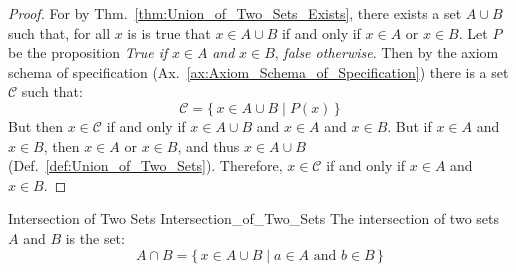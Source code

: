         \begin{proof}
            For by Thm.~\ref{thm:Union_of_Two_Sets_Exists}, there exists
            a set $A\cup{B}$ such that, for all $x$ is is true that
            $x\in{A}\cup{B}$ if and only if $x\in{A}$ or $x\in{B}$. Let
            $P$ be the proposition \textit{True if} $x\in{A}$ \textit{and}
            $x\in{B}$, \textit{false otherwise}. Then by the axiom schema
            of specification (Ax.~\ref{ax:Axiom_Schema_of_Specification})
            there is a set $\mathcal{C}$ such that:
            \begin{equation}
                \mathcal{C}=\big\{\,x\in{A}\cup{B}\;|\;P(x)\,\big\}
            \end{equation}
            But then $x\in\mathcal{C}$ if and only if $x\in{A}\cup{B}$ and
            $x\in{A}$ and $x\in{B}$. But if $x\in{A}$ and $x\in{B}$, then
            $x\in{A}$ or $x\in{B}$, and thus $x\in{A}\cup{B}$
            (Def.~\ref{def:Union_of_Two_Sets}). Therefore, $x\in\mathcal{C}$
            if and only if $x\in{A}$ and $x\in{B}$.
        \end{proof}
        \begin{fdefinition}{Intersection of Two Sets}
                           {Intersection_of_Two_Sets}
            The \gls{intersection of two sets} $A$ and $B$ is the set:
            \begin{equation*}
                A\cap{B}
                =\big\{\,x\in{A}\cup{B}\;|\;
                    a\in{A}\textrm{ and }b\in{B}\,\big\}
            \end{equation*}
        \end{fdefinition}
